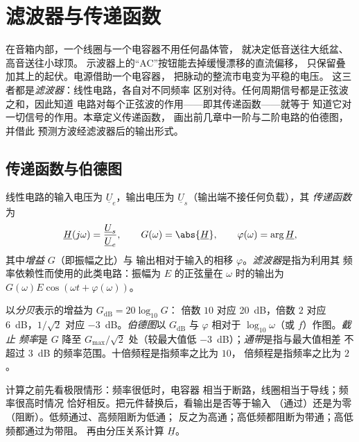 \chapter{滤波器与传递函数}\label{ch:b1:filters-transfer-functions}

在音箱内部，一个线圈与一个电容器不用任何晶体管，
就决定低音送往大纸盆、高音送往小球顶。
示波器上的“AC”按钮能去掉缓慢漂移的直流偏移，
只保留叠加其上的起伏。电源借助一个电容器，
把脉动的整流市电变为平稳的电压。
这三者都是\emph{滤波器}：线性电路，各自对不同频率
区别对待。任何周期信号都是正弦波之和，因此知道
电路对每个正弦波的作用——即其传递函数——就等于
知道它对一切信号的作用。本章定义传递函数，
画出前几章中一阶与二阶电路的伯德图，
并借此
预测方波经滤波器后的输出形式。

\section{传递函数与伯德图}

\begin{definition}[传递函数]\label{def:b1:filters-transfer-functions:H}
线性电路的输入电压为 $\underline U_e$，输出电压为
$\underline U_s$（输出端不接任何负载），其
\emph{传递函数}为
\[
\underline H(j\omega) = \frac{\underline U_s}{\underline U_e},
\qquad G(\omega) = \abs{\underline H}, \qquad \varphi(\omega) = \arg\underline H,
\]
其中\emph{增益} $G$（即振幅之比）与
输出相对于输入的相移 $\varphi$。\emph{滤波器}是指为利用其
频率依赖性而使用的此类电路：振幅为 $E$ 的正弦量在
$\omega$ 时的输出为 $G(\omega)E\cos(\omega t + \varphi(\omega))$。
\end{definition}

\begin{definition}[分贝；伯德图]\label{def:b1:filters-transfer-functions:bode}
以\emph{分贝}表示的增益为 $G_{\mathrm{dB}} = 20\log_{10}G$：
倍数 $10$ 对应 \qty{20}{dB}，倍数 $2$ 对应 \qty{6}{dB}，$1/\sqrt2$ 对应
\qty{-3}{dB}。\emph{伯德图}以 $G_{\mathrm{dB}}$ 与
$\varphi$ 相对于 $\log_{10}\omega$（或 $f$）作图。\emph{截止
频率}是 $G$ 降至 $G_{\max}/\sqrt2$ 处（较最大值低
\qty{-3}{dB}）；\emph{通带}是指与最大值相差
不超过 \qty{3}{dB} 的频率范围。十倍频程是指频率之比为 $10$，
倍频程是指频率之比为 $2$。
\end{definition}

\begin{method}[滤波器类型的快速判断]\label{met:b1:filters-transfer-functions:nature}
计算之前先看极限情形：频率很低时，电容器
相当于断路，线圈相当于导线；频率很高时情况
恰好相反。把元件替换后，看输出是否等于输入
（通过）还是为零（阻断）。低频通过、高频阻断为低通；
反之为高通；高低频都阻断为带通；高低频都通过为带阻。
再由分压关系计算 $\underline H$。
\end{method}

